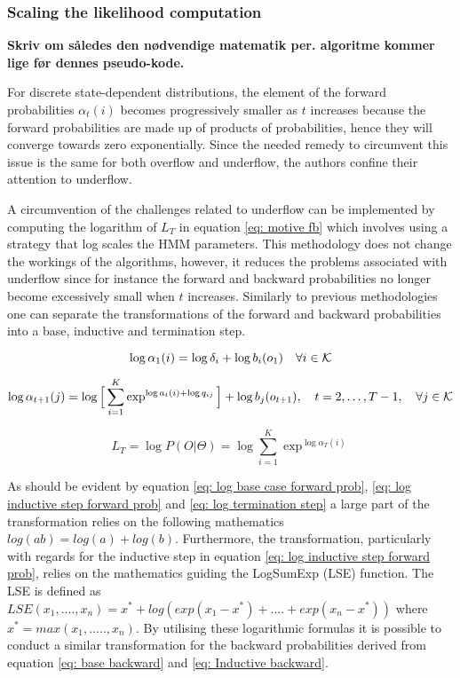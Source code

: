\subsubsection{Scaling the likelihood computation}
\textbf{Skriv om således den nødvendige matematik per. algoritme kommer lige før dennes pseudo-kode.}

For discrete state-dependent distributions, the element of the forward probabilities $\alpha_t(i)$ becomes progressively smaller as $t$ increases because the forward probabilities are made up of products of probabilities, hence they will converge towards zero exponentially. Since the needed remedy to circumvent this issue is the same for both overflow and underflow, the authors confine their attention to underflow.

A circumvention of the challenges related to underflow can be implemented by computing the logarithm of $L_T$ in equation \ref{eq: motive fb} which involves using a strategy that log scales the HMM parameters. This methodology does not change the workings of the algorithms, however, it reduces the problems associated with underflow since for instance the forward and backward probabilities no longer become excessively small when $t$ increases. Similarly to previous methodologies one can separate the transformations of the forward and backward probabilities into a base, inductive and termination step.  

\begin{equation}
    \log\alpha_1(i) = \log\delta_i + \log b_i(o_1)
    \quad \forall i \in\operatorname{\mathcal{K}}
    \label{eq: log base case forward prob}
\end{equation}

\begin{equation}
    \log\alpha_{t+1}(j) = \log\Big[\sum_{i=1}^K \exp^{\log a_t(i)+\log q_{ij}}\Big] + \log b_j(o_{t+1}),
    \quad t=2,\ldots,T-1, 
    \quad \forall j \in\operatorname{\mathcal{K}}
    \label{eq: log inductive step forward prob}
\end{equation}

\begin{equation}
     L_T = \log P(O |\Theta) = \log\sum_{i=1}^K \exp^{\log\alpha_T(i)}
    \label{eq: log termination step}
\end{equation}

As should be evident by equation \ref{eq: log base case forward prob}, \ref{eq: log inductive step forward prob} and \ref{eq: log termination step} a large part of the transformation relies on the following mathematics $log(ab) = log(a) + log(b)$. Furthermore, the transformation, particularly with regards for the inductive step in equation \ref{eq: log inductive step forward prob}, relies on the mathematics guiding the LogSumExp (LSE) function. The LSE is defined as $LSE(x_1,....,x_n) = x^* + log(exp(x_1-x^*)+....+exp(x_n-x^*))$ where $x^* = max(x_1,.....,x_n)$. By utilising these logarithmic formulas it is possible to conduct a similar transformation for the backward probabilities derived from equation \ref{eq: base backward} and \ref{eq: Inductive backward}. 

